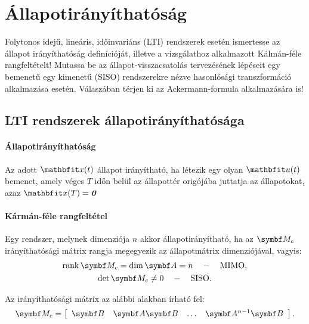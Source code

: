 \section{Állapotirányíthatóság}

\begin{about}
  Folytonos idejű, lineáris, időinvariáns (LTI) rendszerek esetén ismertesse
  az állapot irányíthatóság definícióját, illetve a vizsgálathoz alkalmazott
  Kálmán-féle rangfeltételt! Mutassa be az állapot-visszacsatolás tervezésének
  lépéseit egy bemenetű egy kimenetű (SISO) rendszerekre nézve hasonlósági
  transzformáció alkalmazása esetén. Válaszában térjen ki az Ackermann-formula
  alkalmazására is!
\end{about}

\subsection{LTI rendszerek állapotirányíthatósága}

\paragraph{Állapotirányíthatóság}

Az adott $\rvec x(t)$ állapot irányítható, ha létezik egy olyan $\rvec u(t)$
bemenet, amely véges $T$ időn belül az állapottér origójába juttatja az
állapotokat, azaz $\rvec x(T) = \nvec$

\paragraph{Kármán-féle rangfeltétel}

Egy rendszer, melynek dimenziója $n$ akkor állapotirányítható, ha az $\rmat M_c$
irányíthatósági mátrix rangja megegyezik az állapotmátrix dimenziójával, vagyis:
\begin{gather}
  \rank \rmat M_c = \dim \rmat A = n
  \quad - \quad \text{MIMO},
  \\
  \det \rmat M_c \neq 0
  \quad - \quad \text{SISO}.
\end{gather}

Az irányíthatósági mátrix az alábbi alakban írható fel:
\bgroup
{}
\def\arraystretch{1.2}
\begin{equation}
  \rmat M_c = \left[\begin{array}{ c : c : c : c }
      \rmat B         &
      \rmat A \rmat B &
      \dots           &
      \rmat A^{n-1} \rmat B
    \end{array}\right]
  .
  \label{eq:M_c}
\end{equation}
\egroup

